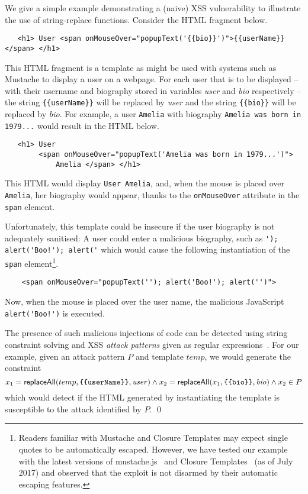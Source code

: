 

\begin{example}
We give a simple example demonstrating a (naive) XSS vulnerability to illustrate the use of string-replace functions.
Consider the HTML fragment below.
\begin{verbatim}
   <h1> User <span onMouseOver="popupText('{{bio}}')">{{userName}}</span> </h1>
\end{verbatim}
This HTML fragment is a template as might be used with systems such as Mustache to display a user on a webpage.
For each user that is to be displayed -- with their username and biography stored in variables \emph{user} and \emph{bio} respectively -- the string \verb+{{userName}}+ will be replaced by \emph{user} and the string \verb+{{bio}}+ will be replaced by \emph{bio}.
For example, a user \verb+Amelia+ with biography \verb+Amelia was born in 1979...+ would result in the HTML below.
\begin{verbatim}
   <h1> User 
        <span onMouseOver="popupText('Amelia was born in 1979...')">
            Amelia </span> </h1>
\end{verbatim}
This HTML would display \verb+User Amelia+, and, when the mouse is placed over \verb+Amelia+, her biography would appear, thanks to the \verb+onMouseOver+ attribute in the \verb+span+ element.

Unfortunately, this template could be insecure if the user biography is not adequately sanitised: 
A user could enter a malicious biography, such as \verb+'); alert('Boo!'); alert('+ which would cause the following instantiation of the \verb+span+ element\footnote{
	Readers familiar with Mustache and Closure Templates may expect single quotes to be automatically escaped.
	However, we have tested our example with the latest versions of mustache.js~\cite{MustacheJS} and Closure Templates~\cite{Closure} (as of July 2017) and observed that the exploit is not disarmed by their automatic escaping features.
}.
\begin{verbatim}
    <span onMouseOver="popupText(''); alert('Boo!'); alert('')">
\end{verbatim}
Now, when the mouse is placed over the user name, the malicious JavaScript \verb+alert('Boo!')+ is executed.

The presence of such malicious injections of code can be detected using string constraint solving and XSS \emph{attack patterns} given as regular expressions~\cite{BCFJKKV08,Berkeley-JavaScript,YABI14}.
For our example, given an attack pattern $P$ and template $temp$, we would generate the constraint
\[
    x_1 = \replaceall(temp, \verb+{{userName}}+, \mathit{user})
    \land
    x_2 = \replaceall(x_1, \verb+{{bio}}+, \mathit{bio})
    \land
    x_2 \in P
\]
which would detect if the HTML generated by instantiating the template is
    susceptible to the attack identified by $P$. \qed
\end{example}

